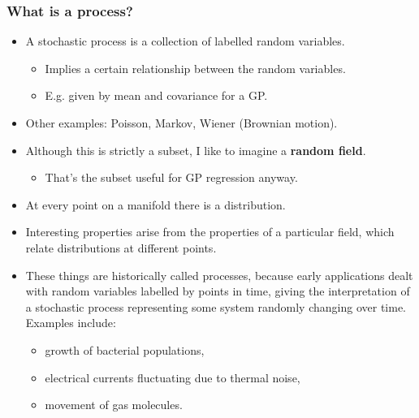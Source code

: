 \begin{frame} \frametitle{What is a process?}
\begin{itemize}
  \item A stochastic process is a collection of labelled random variables.
  \begin{itemize}
    \item Implies a certain relationship between the random variables.
    \item E.g. given by mean and covariance for a GP.
  \end{itemize}
  \item Other examples: Poisson, Markov, Wiener (Brownian motion).
  \vspace{4mm}
  \item Although this is strictly a subset,
    I like to imagine a \textbf{random field}.
  \begin{itemize}
    \item That's the subset useful for GP regression anyway.
  \end{itemize}
  \item At every point on a manifold there is a distribution.
  \item Interesting properties arise from the properties of a particular field,
    which relate distributions at different points.
  \vspace{4mm}
  \item These things are historically called processes, because early
    applications dealt with random variables labelled by points in time,
    giving the interpretation of a stochastic process representing
    some system randomly changing over time. Examples include:
  \begin{itemize}
    \item growth of bacterial populations,
    \item electrical currents fluctuating due to thermal noise,
    \item movement of gas molecules.
  \end{itemize}
\end{itemize}
\end{frame}

